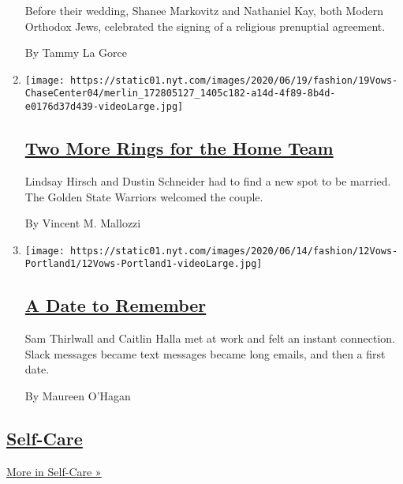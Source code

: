 \begin{enumerate}
  Before their wedding, Shanee Markovitz and Nathaniel Kay, both Modern
  Orthodox Jews, celebrated the signing of a religious prenuptial
  agreement.

  By Tammy La Gorce
\item
  \texttt{[image: https://static01.nyt.com/images/2020/06/19/fashion/19Vows-ChaseCenter04/merlin\_172805127\_1405c182-a14d-4f89-8b4d-e0176d37d439-videoLarge.jpg]}

  \hypertarget{two-more-rings-for-the-home-team}{%
  \subsection{\texorpdfstring{\href{/2020/06/19/style/two-more-rings-for-the-home-team.html}{Two
  More Rings for the Home
  Team}}{Two More Rings for the Home Team}}\label{two-more-rings-for-the-home-team}}

  Lindsay Hirsch and Dustin Schneider had to find a new spot to be
  married. The Golden State Warriors welcomed the couple.

  By Vincent M. Mallozzi
\item
  \texttt{[image: https://static01.nyt.com/images/2020/06/14/fashion/12Vows-Portland1/12Vows-Portland1-videoLarge.jpg]}

  \hypertarget{a-date-to-remember}{%
  \subsection{\texorpdfstring{\href{/2020/06/12/fashion/weddings/a-date-to-remember.html}{A
  Date to Remember}}{A Date to Remember}}\label{a-date-to-remember}}

  Sam Thirlwall and Caitlin Halla met at work and felt an instant
  connection. Slack messages became text messages became long emails,
  and then a first date.

  By Maureen O'Hagan
\end{enumerate}

\hypertarget{self-care}{%
\subsection{\texorpdfstring{\href{/section/style/self-care}{Self-Care}}{Self-Care}}\label{self-care}}

\href{/section/style/self-care}{More in Self-Care »}

